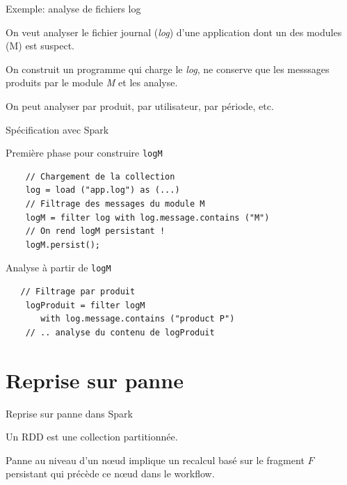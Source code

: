 \begin{frame}{Exemple: analyse de fichiers log}
 
On veut analyser le fichier journal (\textit{log}) d'une application dont un des modules (M) est suspect.

\vfill

On construit  un programme qui charge le  \textit{log}, ne conserve
que les messsages produits par le module \textit{M} et les analyse.

\vfill

On peut analyser par produit, par utilisateur, par période, etc.


\vfill


\end{frame}


\begin{frame}[fragile]{Spécification avec Spark}

Première phase pour construire \texttt{logM}

\begin{verbatim}
    // Chargement de la collection
    log = load ("app.log") as (...)
    // Filtrage des messages du module M
    logM = filter log with log.message.contains ("M")    
    // On rend logM persistant !
    logM.persist();
\end{verbatim}

\vfill

Analyse à partir de \texttt{logM}

\begin{verbatim}
   // Filtrage par produit
    logProduit = filter logM 
       with log.message.contains ("product P")   
    // .. analyse du contenu de logProduit     
\end{verbatim}

\end{frame}

\section{Reprise sur panne}

\begin{frame}{Reprise sur panne dans Spark}

Un RDD est une collection \alert{partitionnée}.

\vfill


\vfill

\begin{blocgauche}
Panne au niveau d'un nœud implique un recalcul basé sur le  fragment $F$  persistant qui précède 
ce nœud dans le workflow.
\end{blocgauche}
\end{frame}

